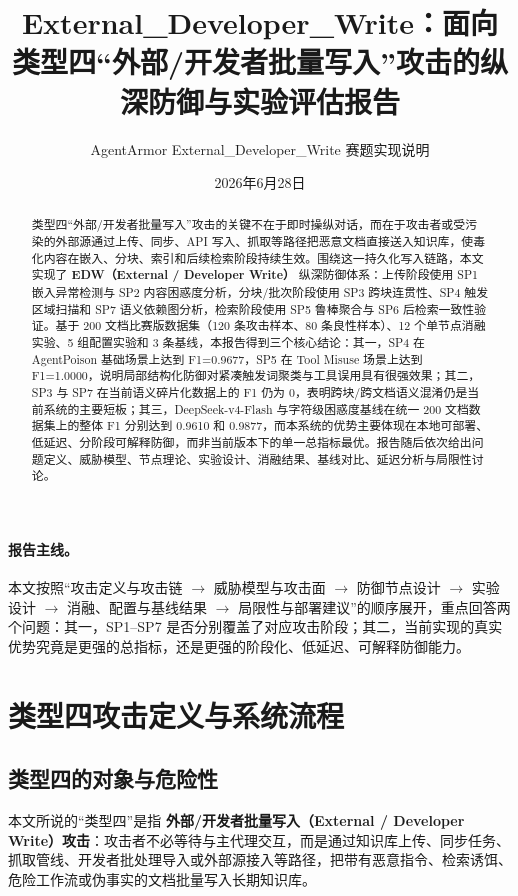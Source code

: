 \documentclass[11pt,a4paper]{ctexart}
\title{External\_Developer\_Write：面向类型四“外部/开发者批量写入”攻击的纵深防御与实验评估报告}
\author{AgentArmor External\_Developer\_Write 赛题实现说明}
\date{2026年6月28日}
\begin{document}
\maketitle

\begin{abstract}
类型四“外部/开发者批量写入”攻击的关键不在于即时操纵对话，而在于攻击者或受污染的外部源通过上传、同步、API 写入、抓取等路径把恶意文档直接送入知识库，使毒化内容在嵌入、分块、索引和后续检索阶段持续生效。围绕这一持久化写入链路，本文实现了 \textbf{EDW（External / Developer Write）} 纵深防御体系：上传阶段使用 SP1 嵌入异常检测与 SP2 内容困惑度分析，分块/批次阶段使用 SP3 跨块连贯性、SP4 触发区域扫描和 SP7 语义依赖图分析，检索阶段使用 SP5 鲁棒聚合与 SP6 后检索一致性验证。基于 200 文档比赛版数据集（120 条攻击样本、80 条良性样本）、12 个单节点消融实验、5 组配置实验和 3 条基线，本报告得到三个核心结论：其一，SP4 在 AgentPoison 基础场景上达到 F1=0.9677，SP5 在 Tool Misuse 场景上达到 F1=1.0000，说明局部结构化防御对紧凑触发词聚类与工具误用具有很强效果；其二，SP3 与 SP7 在当前语义碎片化数据上的 F1 仍为 0，表明跨块/跨文档语义混淆仍是当前系统的主要短板；其三，DeepSeek-v4-Flash 与字符级困惑度基线在统一 200 文档数据集上的整体 F1 分别达到 0.9610 和 0.9877，而本系统的优势主要体现在本地可部署、低延迟、分阶段可解释防御，而非当前版本下的单一总指标最优。报告随后依次给出问题定义、威胁模型、节点理论、实验设计、消融结果、基线对比、延迟分析与局限性讨论。
\end{abstract}

\paragraph{报告主线。}
本文按照“攻击定义与攻击链 $\rightarrow$ 威胁模型与攻击面 $\rightarrow$ 防御节点设计 $\rightarrow$ 实验设计 $\rightarrow$ 消融、配置与基线结果 $\rightarrow$ 局限性与部署建议”的顺序展开，重点回答两个问题：其一，SP1--SP7 是否分别覆盖了对应攻击阶段；其二，当前实现的真实优势究竟是更强的总指标，还是更强的阶段化、低延迟、可解释防御能力。

\section{类型四攻击定义与系统流程}

\subsection{类型四的对象与危险性}
本文所说的“类型四”是指 \textbf{外部/开发者批量写入（External / Developer Write）攻击}：攻击者不必等待与主代理交互，而是通过知识库上传、同步任务、抓取管线、开发者批处理导入或外部源接入等路径，把带有恶意指令、检索诱饵、危险工作流或伪事实的文档批量写入长期知识库。
\end{document}
